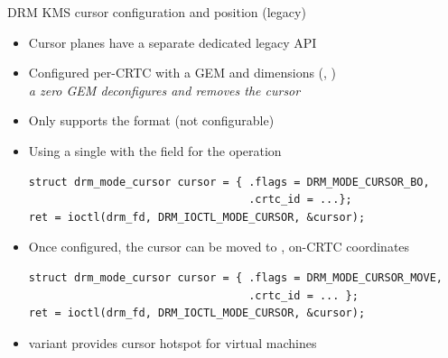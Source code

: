 \begin{frame}[fragile]{DRM KMS cursor configuration and position (legacy)}
  \begin{itemize}
  \item Cursor planes have a separate dedicated legacy API
  \item Configured per-CRTC with a GEM  and dimensions (, )\\
  \textit{a zero GEM  deconfigures and removes the cursor}
  \item Only supports the  format (not configurable)
  \item Using a single  with the  field for the operation
  \begin{verbatim}
struct drm_mode_cursor cursor = { .flags = DRM_MODE_CURSOR_BO,
                                  .crtc_id = ...};
ret = ioctl(drm_fd, DRM_IOCTL_MODE_CURSOR, &cursor);
  \end{verbatim}
  \item Once configured, the cursor can be moved to ,  on-CRTC coordinates
  \begin{verbatim}
struct drm_mode_cursor cursor = { .flags = DRM_MODE_CURSOR_MOVE,
                                  .crtc_id = ... };
ret = ioctl(drm_fd, DRM_IOCTL_MODE_CURSOR, &cursor);
  \end{verbatim}
  \item {} variant provides cursor hotspot for virtual machines
  \end{itemize}
\end{frame}

